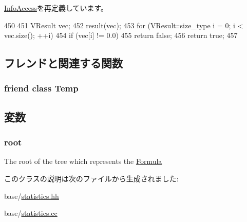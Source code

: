 \hyperlink{classStats_1_1InfoAccess_a4e72b01b727d3165e75cba84eb507491}{InfoAccess}を再定義しています。


\begin{DoxyCode}
450 {
451     VResult vec;
452     result(vec);
453     for (VResult::size_type i = 0; i < vec.size(); ++i)
454         if (vec[i] != 0.0)
455             return false;
456     return true;
457 }
\end{DoxyCode}


\subsection{フレンドと関連する関数}
\hypertarget{classStats_1_1Formula_a39c12a27b0e249e02bb7ef7a1af12f47}{
\subsubsection[{Temp}]{\setlength{\rightskip}{0pt plus 5cm}friend class {\bf Temp}}}
\label{classStats_1_1Formula_a39c12a27b0e249e02bb7ef7a1af12f47}


\subsection{変数}
\hypertarget{classStats_1_1Formula_a9d644ae9def8b6b8b9df1adf4955671d}{
\subsubsection[{root}]{ {\bf root}}}
\label{classStats_1_1Formula_a9d644ae9def8b6b8b9df1adf4955671d}
The root of the tree which represents the \hyperlink{classStats_1_1Formula}{Formula} 

このクラスの説明は次のファイルから生成されました:\begin{DoxyCompactItemize}
\item 
base/\hyperlink{statistics_8hh}{statistics.hh}\item 
base/\hyperlink{statistics_8cc}{statistics.cc}\end{DoxyCompactItemize}
